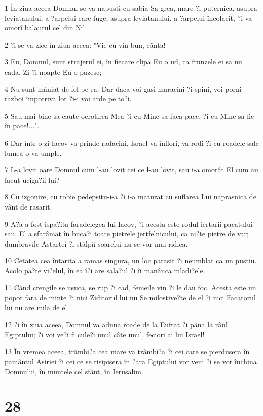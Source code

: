 \par 1 În ziua aceea Domnul se va napusti cu sabia Sa grea, mare ?i puternica, asupra leviatanului, a ?arpelui care fuge, asupra leviatanului, a ?arpelui încolacit, ?i va omorî balaurul cel din Nil.
\par 2 ?i se va zice în ziua aceea: "Vie cu vin bun, cânta!
\par 3 Eu, Domnul, sunt strajerul ei, în fiecare clipa Eu o ud, ca frunzele ei sa nu cada. Zi ?i noapte Eu o pazesc;
\par 4 Nu sunt mâniat de fel pe ea. Dar daca voi gasi maracini ?i spini, voi porni razboi împotriva lor ?i-i voi arde pe to?i.
\par 5 Sau mai bine sa caute ocrotirea Mea ?i cu Mine sa faca pace, ?i cu Mine sa fie în pace!...".
\par 6 Dar într-o zi Iacov va prinde radacini, Israel va înflori, va rodi ?i cu roadele sale lumea o va umple.
\par 7 L-a lovit oare Domnul cum l-au lovit cei ce l-au lovit, sau i-a omorât El cum au facut uciga?ii lui?
\par 8 Cu izgonire, cu robie pedepsitu-i-a ?i i-a maturat cu suflarea Lui naprasnica de vânt de rasarit.
\par 9 A?a a fost ispa?ita faradelegea lui Iacov, ?i acesta este rodul iertarii pacatului sau. El a sfarâmat în buca?i toate pietrele jertfelnicului, ca ni?te pietre de var; dumbravile Astartei ?i stâlpii soarelui nu se vor mai ridica.
\par 10 Cetatea cea întarita a ramas singura, un loc parasit ?i neumblat ca un pustiu. Acolo pa?te vi?elul, în ea î?i are sala?ul ?i îi manânca mladi?ele.
\par 11 Când crengile se usuca, se rup ?i cad, femeile vin ?i le dau foc. Acesta este un popor fara de minte ?i nici Ziditorul lui nu Se milostive?te de el ?i nici Facatorul lui nu are mila de el.
\par 12 ?i în ziua aceea, Domnul va aduna roade de la Eufrat ?i pâna la râul Egiptului; ?i voi ve?i fi cule?i unul câte unul, feciori ai lui Israel!
\par 13 În vremea aceea, trâmbi?a cea mare va trâmbi?a ?i cei care se pierdusera în pamântul Asiriei ?i cei ce se risipisera în ?ara Egiptului vor veni ?i se vor închina Domnului, în muntele cel sfânt, în Ierusalim.

\chapter{28}

